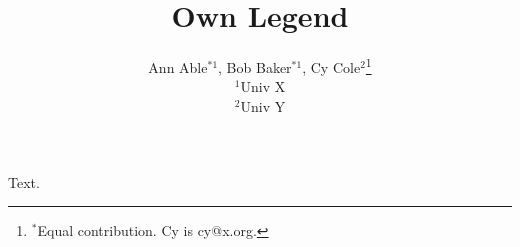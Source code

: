 \documentclass{article}
\title{Own Legend}
\author{Ann Able$^{*1}$, Bob Baker$^{*1}$, Cy Cole$^{2}$\thanks{$^*$Equal contribution. Cy is cy@x.org.}\\
$^1$Univ X\\ $^2$Univ Y}
\begin{document}
\maketitle
Text.
\end{document}
